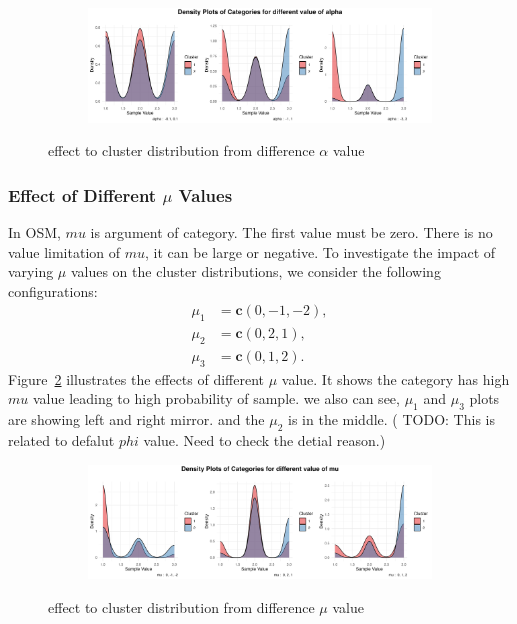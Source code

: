 \documentclass{article}
\begin{document}
\begin{figure}[ht]
  \centering
  \begin{subfigure}{1.0\textwidth}
      \centering
      \includegraphics[width=\textwidth]{images/para_sim/alpha.png}
  \end{subfigure}
  \caption{effect to cluster distribution from difference $\alpha$ value}
  \label{fig:alpha}
\end{figure}

\subsubsection*{Effect of Different $\mu$ Values}
In OSM, $mu$ is argument of category. 
The first value must be zero. There is no value limitation of $mu$, it can be large or negative.
To investigate the impact of varying $\mu$ values on the cluster distributions, 
we consider the following configurations:
\[
\begin{aligned}
\mu_1 &= \mathbf{c}(0, -1, -2), \\
\mu_2 &= \mathbf{c}(0, 2, 1), \\
\mu_3 &= \mathbf{c}(0, 1, 2).
\end{aligned}
\]
Figure~\ref{fig:mu} illustrates the effects of different $\mu$ value.
It shows the category has high $mu$ value leading to high probability of sample.
we also can see, $\mu_1$ and $\mu_3$ plots are showing left and right mirror. 
and the $\mu_2$ is in the middle.
( TODO: This is related to defalut $phi$ value. 
Need to check the detial reason.)

\begin{figure}[ht]
  \centering
  \begin{subfigure}{1.0\textwidth}
      \centering
      \includegraphics[width=\textwidth]{images/para_sim/mu.png}
  \end{subfigure}
  \caption{effect to cluster distribution from difference $\mu$ value}
  \label{fig:mu}
\end{figure}
\end{document}
